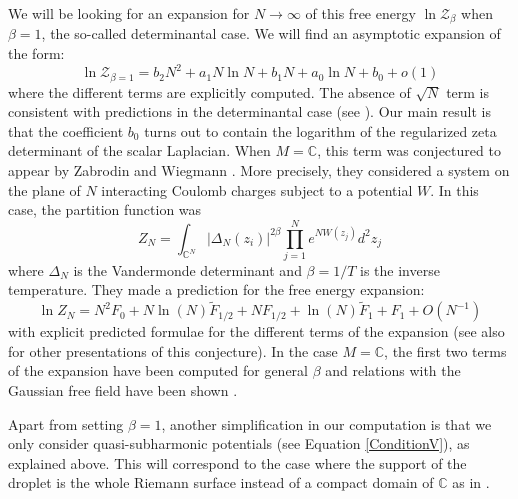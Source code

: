 \documentclass{article}
\theoremstyle{definition}
\theoremstyle{remark}
\begin{document}
We will be looking for an expansion for $N \to \infty$ of this free energy $\ln \mathcal{Z}_{\beta}$ when $\beta=1$, the so-called determinantal case. We will find an asymptotic expansion of the form: 
$$\ln \mathcal{Z}_{\beta=1}=b_{2}N^{2}+a_{1} N\ln N + b_{1} N + a_{0} \ln N +b_{0} +o(1)$$ where the different terms are explicitly computed. The absence of $\sqrt{N}$ term is consistent with predictions in the determinantal case (see \cite[§9.3]{serfaty2024lecturescoulombrieszgases}). Our main result is that the coefficient $b_{0}$ turns out to contain the logarithm of the regularized zeta determinant of the scalar Laplacian. When $M=\mathbb{C}$, this term was conjectured to appear by Zabrodin and Wiegmann \cite{Zabrodin_2006}. More precisely, they considered a system on the plane of $N$ interacting Coulomb charges subject to a potential $W$. In this case, the partition function was $$Z_{N}=\int_{\mathbb{C}^{N}}|\Delta_{N}(z_{i})|^{2\beta}\prod_{j=1}^{N}e^{NW(z_{j})}d^{2}z_{j}$$ where $\Delta_{N}$ is the Vandermonde determinant and $\beta=1/T$ is the inverse temperature. They made a prediction for the free energy expansion: $$\ln Z_{N}=N^{2}F_{0}+N\ln(N)\tilde{F}_{1/2}+ N  F_{1/2}+\ln(N)\tilde{F}_{1}+F_{1}+O(N^{-1})$$ with explicit predicted formulae for the different terms of the expansion (see also \cite{Jancovici1994CoulombSS,ExactAsymptCoulombCanForresterTellezWiegmann2015,serfaty2024lecturescoulombrieszgases} for other presentations of this conjecture). In the case $M=\mathbb{C}$, the first two terms of the expansion have been computed for general $\beta$ and relations with the Gaussian free field have been shown \cite{LebléSerfatyLDP,AmeurHedenmalMakarov2011Fluctuations}.

Apart from setting $\beta=1$, another simplification in our computation is that we only consider quasi-subharmonic potentials (see Equation \eqref{ConditionV}), as explained above. This will correspond to the case where the support of the droplet is the whole Riemann surface instead of a compact domain of $\mathbb{C}$ as in \cite{Zabrodin_2006}.
\end{document}
